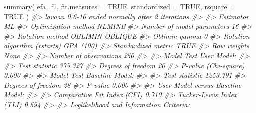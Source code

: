 \documentclass[
  11pt,
]{krantz}
\makeatletter
\newenvironment{Shaded}{\begin{snugshade}}{\end{snugshade}}
\newcommand{\AttributeTok}[1]{\textcolor[rgb]{0.61,0.61,0.61}{#1}}
\newcommand{\CommentTok}[1]{\textcolor[rgb]{0.37,0.37,0.37}{\textit{#1}}}
\newcommand{\ConstantTok}[1]{\textcolor[rgb]{0,0,0}{#1}}
\newcommand{\FunctionTok}[1]{\textcolor[rgb]{0,0,0}{#1}}
\newcommand{\NormalTok}[1]{#1}
\newenvironment{kframe}{%
\medskip{}
\setlength{\fboxsep}{.8em}
 \def\at@end@of@kframe{}%
 \ifinner\ifhmode%
  \def\at@end@of@kframe{\end{minipage}}%
  \begin{minipage}{\columnwidth}%
 \fi\fi%
 \def\FrameCommand##1{\hskip\@totalleftmargin \hskip-\fboxsep
 \colorbox{shadecolor}{##1}\hskip-\fboxsep
     \hskip-\linewidth \hskip-\@totalleftmargin \hskip\columnwidth}%
 \MakeFramed {\advance\hsize-\width
   \@totalleftmargin\z@ \linewidth\hsize
   \@setminipage}}%
 {\par\unskip\endMakeFramed%
 \at@end@of@kframe}
\renewenvironment{Shaded}{\begin{kframe}}{\end{kframe}}
\theoremstyle{definition}
\theoremstyle{definition}
\theoremstyle{definition}
\theoremstyle{definition}
\theoremstyle{remark}
\makeatother
\begin{document}
\begin{Shaded}
\begin{Highlighting}[]
\FunctionTok{summary}\NormalTok{(}
\NormalTok{  efa\_f1,}
  \AttributeTok{fit.measures =} \ConstantTok{TRUE}\NormalTok{,}
  \AttributeTok{standardized =} \ConstantTok{TRUE}\NormalTok{,}
  \AttributeTok{rsquare =} \ConstantTok{TRUE}
\NormalTok{)}
\CommentTok{\#\textgreater{} lavaan 0.6{-}10 ended normally after 2 iterations}
\CommentTok{\#\textgreater{} }
\CommentTok{\#\textgreater{}   Estimator                                         ML}
\CommentTok{\#\textgreater{}   Optimization method                           NLMINB}
\CommentTok{\#\textgreater{}   Number of model parameters                        16}
\CommentTok{\#\textgreater{}                                                       }
\CommentTok{\#\textgreater{}   Rotation method                      OBLIMIN OBLIQUE}
\CommentTok{\#\textgreater{}   Oblimin gamma                                      0}
\CommentTok{\#\textgreater{}   Rotation algorithm (rstarts)               GPA (100)}
\CommentTok{\#\textgreater{}   Standardized metric                             TRUE}
\CommentTok{\#\textgreater{}   Row weights                                     None}
\CommentTok{\#\textgreater{}                                                       }
\CommentTok{\#\textgreater{}   Number of observations                           250}
\CommentTok{\#\textgreater{}                                                       }
\CommentTok{\#\textgreater{} Model Test User Model:}
\CommentTok{\#\textgreater{}                                                       }
\CommentTok{\#\textgreater{}   Test statistic                               375.327}
\CommentTok{\#\textgreater{}   Degrees of freedom                                20}
\CommentTok{\#\textgreater{}   P{-}value (Chi{-}square)                           0.000}
\CommentTok{\#\textgreater{} }
\CommentTok{\#\textgreater{} Model Test Baseline Model:}
\CommentTok{\#\textgreater{} }
\CommentTok{\#\textgreater{}   Test statistic                              1253.791}
\CommentTok{\#\textgreater{}   Degrees of freedom                                28}
\CommentTok{\#\textgreater{}   P{-}value                                        0.000}
\CommentTok{\#\textgreater{} }
\CommentTok{\#\textgreater{} User Model versus Baseline Model:}
\CommentTok{\#\textgreater{} }
\CommentTok{\#\textgreater{}   Comparative Fit Index (CFI)                    0.710}
\CommentTok{\#\textgreater{}   Tucker{-}Lewis Index (TLI)                       0.594}
\CommentTok{\#\textgreater{} }
\CommentTok{\#\textgreater{} Loglikelihood and Information Criteria:}

\end{Highlighting}
\end{Shaded}
\end{document}
